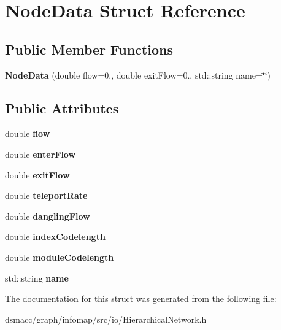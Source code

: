 \hypertarget{structNodeData}{}\section{Node\+Data Struct Reference}
\label{structNodeData}
\subsection*{Public Member Functions}
\begin{DoxyCompactItemize}
\item 
\mbox{\label{structNodeData_ab2479fd1c76fabcc8eb076bce9984196}} 
{\bfseries Node\+Data} (double flow=0., double exit\+Flow=0., std\+::string name=\char`\"{}\char`\"{})
\end{DoxyCompactItemize}
\subsection*{Public Attributes}
\begin{DoxyCompactItemize}
\item 
\mbox{\label{structNodeData_abb447f6f09e91b4d6388a0959541ab23}} 
double {\bfseries flow}
\item 
\mbox{\label{structNodeData_af29b1944fb32041befad63a176b53fbe}} 
double {\bfseries enter\+Flow}
\item 
\mbox{\label{structNodeData_a8f9249d574c5b2b1f32240fc43d5462d}} 
double {\bfseries exit\+Flow}
\item 
\mbox{\label{structNodeData_a5815fda11719693e312d2d1b18761f9c}} 
double {\bfseries teleport\+Rate}
\item 
\mbox{\label{structNodeData_a05f10c789302720437a829803955a335}} 
double {\bfseries dangling\+Flow}
\item 
\mbox{\label{structNodeData_af6b92693d7ea12029cdfc3fc365b50c6}} 
double {\bfseries index\+Codelength}
\item 
\mbox{\label{structNodeData_aa80365d3abd8ef7adb8e09e6675a1e35}} 
double {\bfseries module\+Codelength}
\item 
\mbox{\label{structNodeData_ab9d310d21190b9374a50a31364f5cfe5}} 
std\+::string {\bfseries name}
\end{DoxyCompactItemize}


The documentation for this struct was generated from the following file\+:\begin{DoxyCompactItemize}
\item 
dsmacc/graph/infomap/src/io/Hierarchical\+Network.\+h\end{DoxyCompactItemize}
